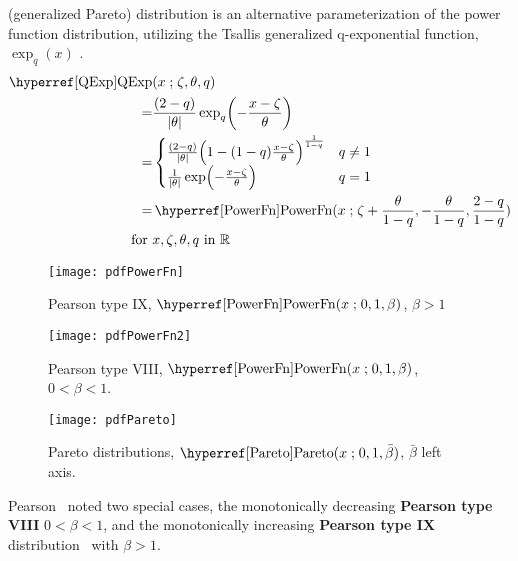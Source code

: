  (generalized Pareto) distribution is an alternative parameterization of the power function distribution, utilizing the Tsallis generalized q-exponential function, $\exp_q(x)$ .
\begin{align}
\label{QExp}
\opr{QExp}&(x\given  \pLoc,\theta,q) \\
\notag
= & \frac{(2-q)}{|\theta|} \exp_q\Left(- \frac{x-\pLoc}{\theta} \Right)  \checked
\\  
= &
\begin{cases}
\frac{(2-q)}{|\theta|}\Left(1 - (1-q) \frac{x-\pLoc}{\theta} \Right)^{\frac{1}{1-q}} & q \neq 1 \checked
\\
\notag
\tfrac{1}{|\theta| }\exp\Left(- \frac{x-\pLoc}{\theta} \Right)  & q=1 \checked
\end{cases}
\notag
\\
=&  \opr{PowerFn}(x\given \pLoc+\frac{\theta}{1-q},-\frac{\theta}{1-q},\frac{2-q}{1-q}) \checked
\notag
\\
\notag  \text{for } & x, \pLoc, \theta, q \text{ in } \mathbb{R}
\end{align}



\begin{figure}[p]
\begin{center}
\texttt{[image: pdfPowerFn]}
\end{center}
\caption[Pearson IX distributions]{Pearson type IX, $\opr{PowerFn}(x\given 0,1,\beta)$, $\beta>1$
}
\end{figure}
%
%
\begin{figure}[p]
\begin{center}
\texttt{[image: pdfPowerFn2]}
\end{center}
\caption[Pearson VIII distributions]{Pearson type VIII, $\opr{PowerFn}(x\given 0,1,\beta)$, $0<\beta<1$. }
\end{figure}
%
\begin{figure}[tp]
\begin{center}
\texttt{[image: pdfPareto]}
\end{center}
\caption[Pareto distributions]{Pareto distributions, $\opr{Pareto}(x\given 0,1,\bar\beta)$, $\bar\beta$ left axis.}
\end{figure}




Pearson~\cite{Pearson1916, Johnson1994} noted two special cases, the monotonically decreasing {\bf Pearson type VIII} $0<\beta <1$, and the monotonically increasing {\bf Pearson type IX} distribution~\cite{Pearson1916, Johnson1994} with $\beta>1$. 


